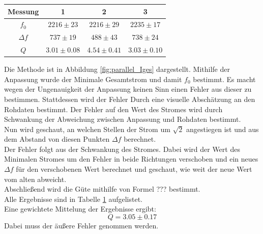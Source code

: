 \documentclass[12pt,a4paper]{article}
\begin{document}
\begin{table}
\centering
\begin{tabular}{|c|c|c|c|}
\hline
Messung & 1&2&3\\
\hline
$f_0$ & $2216\pm 23 $ & $2216\pm 29 $ & $2235\pm 17$\\
\hline
$\Delta f$ & $737\pm 19 $ & $488\pm 43 $ & $738\pm 24$\\
\hline
$Q$ & $3.01\pm 0.08 $ & $4.54\pm 0.41 $ & $3.03\pm 0.10$\\
\hline
\end{tabular}
\label{tab:parallel_methode1}
\end{table}

Die Methode ist in Abbildung \ref{fig:parallel_Iges} dargestellt.
Mithilfe der Anpassung wurde der Minimale Gesamtstrom und damit $f_0$ bestimmt. Es macht wegen der Ungenauigkeit der Anpassung keinen Sinn einen Fehler aus dieser zu bestimmen.  Stattdessen wird der Fehler Durch eine visuelle Abschätzung an den Rohdaten bestimmt.
Der Fehler auf den Wert des Stromes wird durch Schwankung der Abweichung zwischen Anpassung und Rohdaten bestimmt.\\
Nun wird geschaut, an welchen Stellen der Strom um $\sqrt{2}$ angestiegen ist und aus dem Abstand von diesen Punkten $\Delta f$ berechnet.\\
Der Fehler folgt aus der Schwankung des Stromes. Dabei wird der Wert des Minimalen Stromes um den Fehler in beide Richtungen verschoben und ein neues $\Delta f$ für den verschobenen Wert berechnet und geschaut, wie weit der neue Wert vom alten abweicht.\\
Abschließend wird die Güte mithilfe von Formel ??? bestimmt.\\
Alle Ergebnisse sind in Tabelle \ref{tab:parallel_methode1} aufgelistet.\\
Eine gewichtete Mittelung der Ergebnisse ergibt:
\begin{equation}
Q = 3.05\pm 0.17 
\end{equation}
Dabei muss der äußere Fehler genommen werden.
\end{document}
